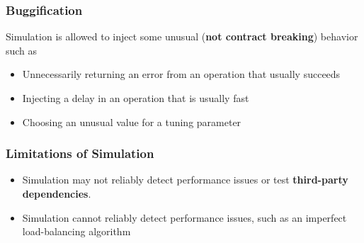 \begin{frame}
    \frametitle{Buggification}
    Simulation is allowed to inject some unusual (\textbf{not contract breaking}) behavior such as 
    \begin{itemize}
        \item Unnecessarily returning an error from an operation that usually succeeds
        \item Injecting a delay in an operation that is usually fast
        \item Choosing an unusual value for a tuning parameter
    \end{itemize}
\end{frame}
\begin{frame}
    \frametitle{Limitations of Simulation}
    \begin{itemize}
        \item Simulation may not reliably detect performance issues or test \textbf{third-party dependencies}.
        \item Simulation cannot reliably detect performance issues, such as an imperfect load-balancing algorithm
    \end{itemize}
\end{frame}